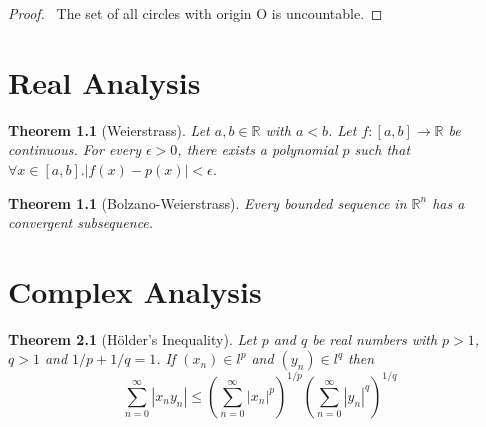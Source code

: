 \documentclass{book}
\let\qed\relax
\newtheorem{thm}[ax]{Theorem}
\theoremstyle{definition}
\begin{document}
\begin{proof}
\pf\ The set of all circles with origin O is uncountable. \qed
\end{proof}

\chapter{Real Analysis}

\begin{thm}[Weierstrass]
Let $a,b \in \mathbb{R}$ with $a < b$. Let $f : [a,b] \rightarrow \mathbb{R}$ be continuous. For every $\epsilon > 0$, there exists a polynomial $p$ such that $\forall x \in [a,b]. |f(x) - p(x)| < \epsilon$.
\end{thm}


\begin{thm}[Bolzano-Weierstrass]
Every bounded sequence in $\mathbb{R}^n$ has a convergent subsequence.
\end{thm}

\chapter{Complex Analysis}

\begin{thm}[H\"{o}lder's Inequality]
Let $p$ and $q$ be real numbers with $p > 1$, $q > 1$ and $1/p + 1/q = 1$. If $(x_n) \in l^p$ and $(y_n) \in l^q$ then
\[ \sum_{n=0}^\infty |x_n y_n| \leq \left( \sum_{n=0}^\infty  |x_n|^p \right)^{1/p} \left( \sum_{n=0}^\infty |y_n|^q \right)^{1/q} \]
\end{thm}
\end{document}
